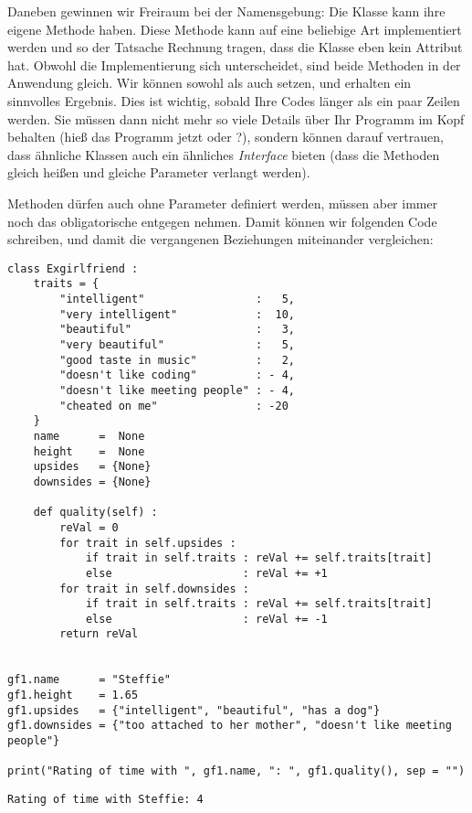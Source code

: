 Daneben gewinnen wir Freiraum bei der Namensgebung: Die Klasse  kann ihre eigene Methode  haben. Diese Methode kann auf eine beliebige Art implementiert werden und so der Tatsache Rechnung tragen, dass die Klasse  eben kein Attribut  hat. Obwohl die Implementierung sich unterscheidet, sind beide Methoden in der Anwendung gleich. Wir können sowohl  als auch  setzen, und erhalten ein sinnvolles Ergebnis. Dies ist wichtig, sobald Ihre Codes länger als ein paar Zeilen werden. Sie müssen dann nicht mehr so viele Details über Ihr Programm im Kopf behalten (hieß das Programm jetzt  oder ?), sondern können darauf vertrauen, dass ähnliche Klassen auch ein ähnliches \emph{Interface} bieten (\ie dass die Methoden gleich heißen und gleiche Parameter verlangt werden).

Methoden dürfen auch ohne Parameter definiert werden, müssen aber immer noch das obligatorische  entgegen nehmen. Damit können wir folgenden Code schreiben, und damit die vergangenen Beziehungen miteinander vergleichen:
\begin{codebox}
\begin{verbatim}
class Exgirlfriend :
    traits = {
        "intelligent"                 :   5,
        "very intelligent"            :  10,
        "beautiful"                   :   3,
        "very beautiful"              :   5,
        "good taste in music"         :   2,
        "doesn't like coding"         : - 4,
        "doesn't like meeting people" : - 4,
        "cheated on me"               : -20
    }
    name      =  None
    height    =  None
    upsides   = {None}
    downsides = {None}
    
    def quality(self) :
        reVal = 0
        for trait in self.upsides :
            if trait in self.traits : reVal += self.traits[trait]
            else                    : reVal += +1
        for trait in self.downsides :
            if trait in self.traits : reVal += self.traits[trait]
            else                    : reVal += -1
        return reVal


gf1.name      = "Steffie"
gf1.height    = 1.65
gf1.upsides   = {"intelligent", "beautiful", "has a dog"}
gf1.downsides = {"too attached to her mother", "doesn't like meeting people"}

print("Rating of time with ", gf1.name, ": ", gf1.quality(), sep = "")
\end{verbatim}
\end{codebox}
\begin{cmdbox}
\begin{verbatim}
Rating of time with Steffie: 4
\end{verbatim}
\end{cmdbox}

